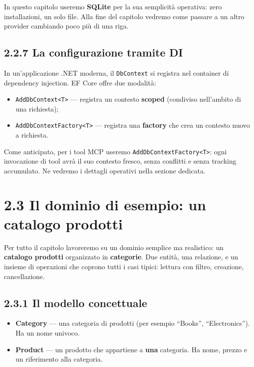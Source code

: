 \documentclass[
  italian,
  10pt,
]{book}
\providecommand{\tightlist}{%
  \setlength{\itemsep}{0pt}\setlength{\parskip}{0pt}}
\begin{document}
In questo capitolo useremo \textbf{SQLite} per la sua semplicità
operativa: zero installazioni, un solo file. Alla fine del capitolo
vedremo come passare a un altro provider cambiando poco più di una riga.

\subsection{2.2.7 La configurazione tramite
DI}\label{la-configurazione-tramite-di}

In un'applicazione .NET moderna, il \texttt{DbContext} si registra nel
container di dependency injection. EF Core offre due modalità:

\begin{itemize}
\tightlist
\item
  \texttt{AddDbContext\textless{}T\textgreater{}} --- registra un
  contesto \textbf{scoped} (condiviso nell'ambito di una richiesta);
\item
  \texttt{AddDbContextFactory\textless{}T\textgreater{}} --- registra
  una \textbf{factory} che crea un contesto nuovo a richiesta.
\end{itemize}

Come anticipato, per i tool MCP useremo
\texttt{AddDbContextFactory\textless{}T\textgreater{}}: ogni invocazione
di tool avrà il suo contesto fresco, senza conflitti e senza tracking
accumulato. Ne vedremo i dettagli operativi nella sezione dedicata.

\section{2.3 Il dominio di esempio: un catalogo
prodotti}\label{il-dominio-di-esempio-un-catalogo-prodotti}

Per tutto il capitolo lavoreremo su un dominio semplice ma realistico:
un \textbf{catalogo prodotti} organizzato in \textbf{categorie}. Due
entità, una relazione, e un insieme di operazioni che coprono tutti i
casi tipici: lettura con filtro, creazione, cancellazione.

\subsection{2.3.1 Il modello concettuale}\label{il-modello-concettuale}

\begin{itemize}
\tightlist
\item
  \textbf{Category} --- una categoria di prodotti (per esempio
  ``Books'', ``Electronics''). Ha un nome univoco.
\item
  \textbf{Product} --- un prodotto che appartiene a \textbf{una}
  categoria. Ha nome, prezzo e un riferimento alla categoria.
\end{itemize}
\end{document}
